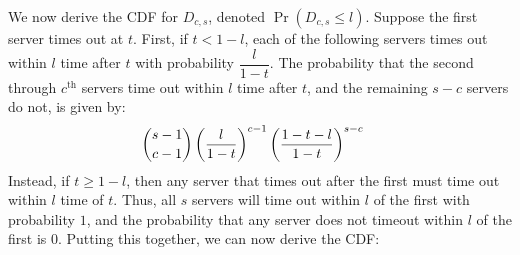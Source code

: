 We now derive the CDF for $D_{c,s}$, denoted $\Pr(D_{c,s} \leq l)$.
Suppose the first server times out at $t$.
%
First, if $t < 1-l$,
each of the following servers times out within $l$ time after $t$ with probability
$\dfrac{l}{1-t}$.
The probability that the second through $c^\text{th}$ servers time out
within $l$ time after $t$, and the remaining $s-c$ servers do not, is given by:
\begin{align*}
& \dbinom{s-1}{c-1}
  \left(\frac{l}{1-t}\right)^{c-1}
  \left(\frac{1-t-l}{1-t}\right)^{s-c}
\end{align*}
\noindent
%
Instead, if $t \geq 1-l$, then any server that times out after the first
must time out within $l$ time of $t$. Thus, all $s$ servers will
time out within $l$ of the first with probability $1$, and the
probability that any server does not timeout within $l$ of the first is
$0$. Putting this together, we can now derive the CDF:
%
